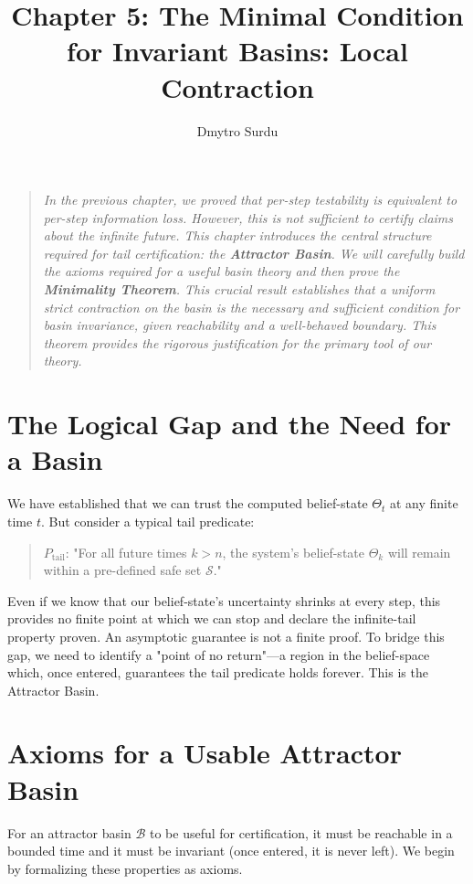 \documentclass[12pt]{article}
\title{\textbf{Chapter 5: The Minimal Condition for Invariant Basins: Local Contraction}}
\author{Dmytro Surdu}
\date{}
\theoremstyle{definition}
\theoremstyle{plain}
\begin{document}
\maketitle

\begin{quote}
\textit{In the previous chapter, we proved that per-step testability is equivalent to per-step information loss. However, this is not sufficient to certify claims about the infinite future. This chapter introduces the central structure required for tail certification: the \textbf{Attractor Basin}. We will carefully build the axioms required for a useful basin theory and then prove the \textbf{Minimality Theorem}. This crucial result establishes that a uniform strict contraction on the basin is the necessary and sufficient condition for basin invariance, given reachability and a well-behaved boundary. This theorem provides the rigorous justification for the primary tool of our theory.}
\end{quote}

\section{The Logical Gap and the Need for a Basin}

We have established that we can trust the computed belief-state $\Theta_t$ at any finite time $t$. But consider a typical tail predicate:
\begin{quote}
$P_{\text{tail}}$: "For all future times $k > n$, the system's belief-state $\Theta_k$ will remain within a pre-defined safe set $\mathcal{S}$."
\end{quote}
Even if we know that our belief-state's uncertainty shrinks at every step, this provides no finite point at which we can stop and declare the infinite-tail property proven. An asymptotic guarantee is not a finite proof. To bridge this gap, we need to identify a "point of no return"—a region in the belief-space which, once entered, guarantees the tail predicate holds forever. This is the Attractor Basin.

\section{Axioms for a Usable Attractor Basin}

For an attractor basin $\mathcal{B}$ to be useful for certification, it must be reachable in a bounded time and it must be invariant (once entered, it is never left). We begin by formalizing these properties as axioms.
\end{document}
